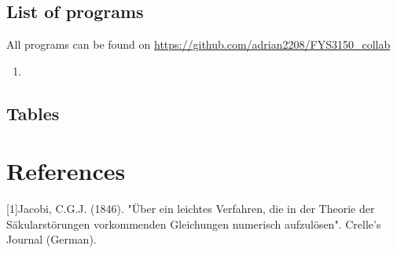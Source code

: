 \documentclass[10pt,a4paper]{article}
\begin{document}
\subsection{List of programs}
All programs can be found on \url{https://github.com/adrian2208/FYS3150_collab}
\begin{enumerate}
\item 
\end{enumerate}
\subsection{Tables}


\section{References}
[1]Jacobi, C.G.J. (1846). "Über ein leichtes Verfahren, die in der Theorie der Säkularstörungen vorkommenden Gleichungen numerisch aufzulösen". Crelle's Journal (German).\\



\begin{comment}

$$
\begin{bmatrix}
0 & 0 & 0 & 0 \\
0 & 0 & 0 & 0 \\
0 & 0 & 0 & 0 \\
0 & 0 & 0 & 0 \\
\end{bmatrix}
$$

\begin{lstlisting}[caption=insert caption]
for (unsigned int i = 0; i<100;i++{
}
\end{lstlisting}

\begin{figure}[h]
\texttt{[image: ]}
\caption{include caption}
\end{figure}

\end{comment}
\end{document}
